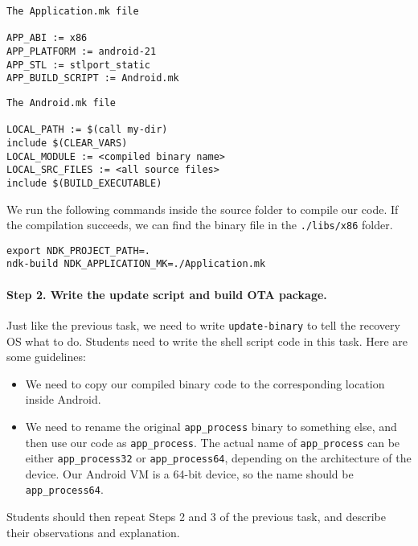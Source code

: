 \begin{lstlisting}[frame=single, caption={}, label=label]
The Application.mk file

APP_ABI := x86
APP_PLATFORM := android-21
APP_STL := stlport_static
APP_BUILD_SCRIPT := Android.mk
\end{lstlisting}


\begin{lstlisting}[frame=single, caption={}, label=label]
The Android.mk file

LOCAL_PATH := $(call my-dir)
include $(CLEAR_VARS)
LOCAL_MODULE := <compiled binary name>
LOCAL_SRC_FILES := <all source files>
include $(BUILD_EXECUTABLE)
\end{lstlisting}
 
We run the following commands inside the source folder to compile our code.
If the compilation succeeds, we can find the binary file in the 
\texttt{./libs/x86} folder.

\begin{lstlisting}
export NDK_PROJECT_PATH=.
ndk-build NDK_APPLICATION_MK=./Application.mk
\end{lstlisting}


\paragraph{Step 2. Write the update script and build OTA package.}
Just like the previous task, we need to write \texttt{update-binary} to 
tell the recovery OS what to do. Students need to write the shell script code in this task.
Here are some guidelines:

\begin{itemize}
  \item We need to copy our compiled binary code to the corresponding location inside Android.  

  \item We need to rename the original \texttt{app\_process} binary to something else, and then
    use our code as \texttt{app\_process}. The actual name of \texttt{app\_process} 
    can be either  \texttt{app\_process32} or \texttt{app\_process64}, depending  
    on the architecture of the device. 
    Our Android VM is a 64-bit device, so the name should be \texttt{app\_process64}. 
\end{itemize}


Students should then repeat Steps 2 and 3 of the previous task, and describe their
observations and explanation.
 


